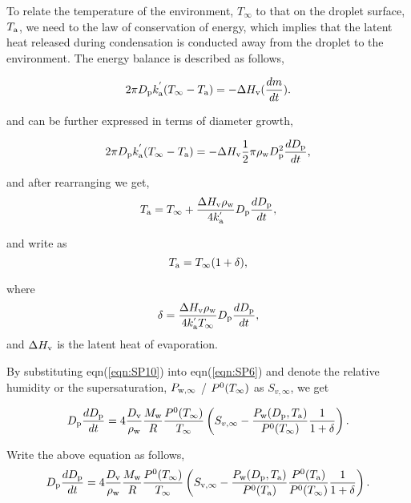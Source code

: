 \documentclass[12pt]{article}
\begin{document}
To relate the temperature of the environment, $T_{\infty}$ to that on the droplet surface, $T_{\rm a}$, we need to the law of conservation of energy, which implies that the latent heat released during condensation is conducted away from the droplet to the environment. The energy balance is described as follows, 

\begin{equation}\label{eqn:SP7}
2 \pi D_{\rm p} k^{'}_{\rm a} (T_{\infty}-T_{\rm a})= -\Delta H_{\rm v}(\frac{dm}{dt}).
\end{equation}

and can be further expressed in terms of diameter growth, 

\begin{equation}\label{eqn:SP8}
2 \pi D_{\rm p} k^{'}_{\rm a} (T_{\infty}-T_{\rm a})= -\Delta H_{\rm v} \frac{1}{2} \pi \rho_{\rm w} D_{\rm p}^{2} \frac{dD_{\rm p}}{dt},
\end{equation}

and after rearranging we get, 
\begin{equation}\label{eqn:SP9}
T_{\rm a}= T_{\infty} + \frac{\Delta H_{\rm v}  \rho_{\rm w}}{4 k^{'}_{\rm a}} D_{\rm p} \frac{dD_{\rm p}}{dt},
\end{equation}

and write as 
\begin{equation}\label{eqn:SP10}
T_{\rm a}=T_{\infty}(1+\delta),
\end{equation}

where 
\begin{equation}\label{eqn:SP11}
\delta= \frac{\Delta H_{\rm v}  \rho_{\rm w}}{4 k^{'}_{\rm a}T_{\infty}} D_{\rm p} \frac{dD_{\rm p}}{dt}, 
\end{equation}
and $\Delta H_{\rm v}$ is the latent heat of evaporation.


By substituting eqn(\ref{eqn:SP10}) into eqn(\ref{eqn:SP6}) and denote the relative humidity or the supersaturation, $P_{\rm w, \infty}$ / $P^{\rm 0}(T_{\infty})$ as $S_{v, \infty}$, we get 

\begin{equation}\label{eqn:SP12}
D_{\rm p}\frac{dD_{\rm p}}{dt}=4 \frac{D_{\rm v}} {\rho_{\rm w}} \frac{M_{\rm w}}{R} \frac{P^{\rm 0}(T_{\infty})} {T_{\infty}} \left(S_{v, \infty} - \frac{P_{\rm w}(D_{\rm p}, T_{\rm a})}{P^{\rm 0}(T_{\infty})} \frac{1}{1+\delta}\right).
\end{equation}


Write the above equation as follows,
\begin{equation}\label{eqn:SP13}
D_{\rm p}\frac{dD_{\rm p}}{dt}=4 \frac{D_{\rm v}} {\rho_{\rm w}} \frac{M_{\rm w}}{R} \frac{P^{\rm 0}(T_{\infty})} {T_{\infty}} \left(S_{\rm v, \infty} - \frac{P_{\rm w}(D_{\rm p}, T_{\rm a})}{P^{\rm 0}(T_{\rm a})} \frac{P^{\rm 0}(T_{\rm a})}{P^{\rm 0}(T_{\infty})}\frac{1}{1+\delta}\right).
\end{equation}
\end{document}
